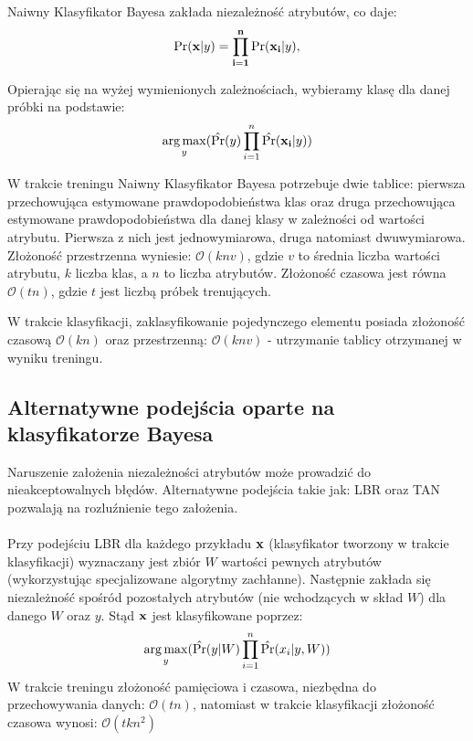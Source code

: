 \documentclass[16]{article}
\begin{document}
Naiwny Klasyfikator Bayesa zakłada niezależność atrybutów, co daje:
\begin{equation}
\label{BayesEquation}
\Pr(\bf{x}|\mathnormal{y}) =  \prod_{i=1}^{n} \Pr(\bf{x_{i}}|\mathnormal{y}),
\end{equation} 

Opierając się na wyżej wymienionych zależnościach, wybieramy klasę dla danej próbki na podstawie:
\begin{equation}
 \operatorname*{arg\,max}_\mathnormal{y} (\hat{\Pr}(\mathnormal{y}) \prod_{i=1}^{n} \hat{\Pr}(\bf{x_{i}}|\mathnormal{y}))
\end{equation} 

W trakcie treningu Naiwny Klasyfikator Bayesa potrzebuje dwie tablice: pierwsza przechowująca estymowane prawdopodobieństwa klas oraz druga przechowująca estymowane prawdopodobieństwa dla danej klasy w zależności od wartości atrybutu. Pierwsza z nich jest jednowymiarowa, druga natomiast dwuwymiarowa. Złożoność przestrzenna wyniesie: $\mathcal{O}(knv)$, gdzie $v$ to średnia liczba wartości atrybutu, $k$ liczba klas, a $n$ to liczba atrybutów. Złożoność czasowa jest równa $\mathcal{O}(tn)$, gdzie $t$ jest liczbą próbek trenujących. 

W trakcie klasyfikacji, zaklasyfikowanie pojedynczego elementu posiada złożoność czasową $\mathcal{O}(kn)$ oraz przestrzenną: $\mathcal{O}(knv)$ - utrzymanie tablicy otrzymanej w wyniku treningu.

\subsection{Alternatywne podejścia oparte na klasyfikatorze Bayesa}
Naruszenie założenia niezależności atrybutów może prowadzić do nieakceptowalnych błędów. Alternatywne podejścia takie jak: LBR oraz TAN pozwalają na rozluźnienie tego założenia. \\\\
Przy podejściu LBR dla każdego przykładu $\bf{x}$ (klasyfikator tworzony w trakcie klasyfikacji) wyznaczany jest zbiór $W$ wartości pewnych atrybutów (wykorzystując specjalizowane algorytmy zachłanne). Następnie zakłada się niezależność spośród pozostałych atrybutów (nie wchodzących w skład $W$) dla danego $W$ oraz $y$. Stąd $\bf{x}$ jest klasyfikowane poprzez:
\begin{equation}
 \operatorname*{arg\,max}_\mathnormal{y} (\hat{\Pr}(\mathnormal{y}|\mathnormal{W}) \prod_{i=1}^{n} \hat{\Pr}(x_{i}|\mathnormal{y}, \mathnormal{W}))
\end{equation} 
W trakcie treningu złożoność pamięciowa i czasowa, niezbędna do przechowywania danych: $\mathcal{O}(tn)$, natomiast w trakcie klasyfikacji złożoność czasowa wynosi: $\mathcal{O}(tkn^{2})$ \\
\end{document}
